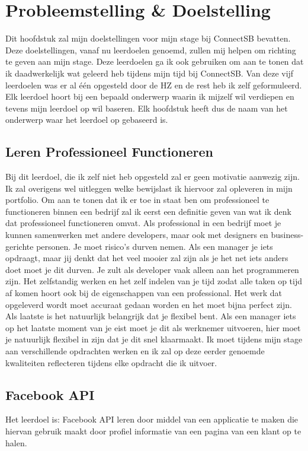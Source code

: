
\section{Probleemstelling \& Doelstelling}
Dit hoofdstuk zal mijn doelstellingen voor mijn stage bij ConnectSB bevatten. Deze doelstellingen, vanaf nu leerdoelen genoemd, zullen mij helpen om richting te geven aan mijn stage. Deze leerdoelen ga ik ook gebruiken om aan te tonen dat ik daadwerkelijk wat geleerd heb tijdens mijn tijd bij ConnectSB. Van deze vijf leerdoelen was er al één opgesteld door de HZ en de rest heb ik zelf geformuleerd.
Elk leerdoel hoort bij een bepaald onderwerp waarin ik mijzelf wil verdiepen en tevens mijn leerdoel op wil baseren. 
Elk hoofdstuk heeft dus de naam van het onderwerp waar het leerdoel op gebaseerd is.

\subsection{Leren Professioneel Functioneren}
Bij dit leerdoel, die ik zelf niet heb opgesteld zal er geen motivatie aanwezig zijn. Ik zal overigens wel uitleggen welke bewijslast ik hiervoor zal opleveren in mijn portfolio. 
Om aan te tonen dat ik er toe in staat ben om professioneel te functioneren binnen een bedrijf zal ik eerst een definitie geven van wat ik denk dat professioneel functioneren omvat. Als professional in een bedrijf moet je kunnen samenwerken met andere developers, maar ook met designers en business-gerichte personen. Je moet risico's durven nemen. Als een manager je iets opdraagt, maar jij denkt dat het veel mooier zal zijn als je het net iets anders doet moet je dit durven. Je zult als developer vaak alleen aan het programmeren zijn. Het zelfstandig werken en het zelf indelen van je tijd zodat alle taken op tijd af komen hoort ook bij de eigenschappen van een professional. Het werk dat opgeleverd wordt moet accuraat gedaan worden en het moet bijna perfect zijn. 
Als laatste is het natuurlijk belangrijk dat je flexibel bent. Als een manager iets op het laatste moment van je eist moet je dit als werknemer uitvoeren, hier moet je natuurlijk flexibel in zijn dat je dit snel klaarmaakt.
Ik moet tijdens mijn stage aan verschillende opdrachten werken en ik zal op deze eerder genoemde kwaliteiten reflecteren tijdens elke opdracht die ik uitvoer.

\subsection{Facebook API}
Het leerdoel is: Facebook API leren door middel van een applicatie te maken die hiervan gebruik maakt door profiel informatie van een pagina van een klant op te halen.

